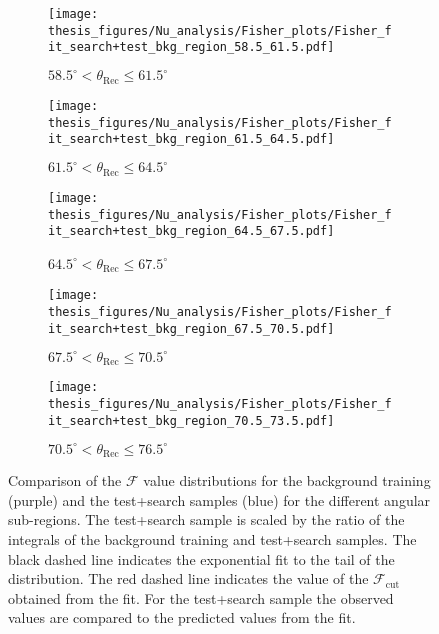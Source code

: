 \begin{figure}[h!]
  \centering
   \begin{subfigure}[l]{.48\textwidth}
     \centering
     \texttt{[image: thesis\_figures/Nu\_analysis/Fisher\_plots/Fisher\_fit\_search+test\_bkg\_region\_58.5\_61.5.pdf]}
     \caption{$ 58.5^{\circ} <\theta_{\text{Rec}} \leq 61.5^{\circ}$}
     \label{fig:58.5-61.5}
   \end{subfigure}
   \begin{subfigure}[r]{.48\textwidth}
     \centering
     \texttt{[image: thesis\_figures/Nu\_analysis/Fisher\_plots/Fisher\_fit\_search+test\_bkg\_region\_61.5\_64.5.pdf]}
     \caption{$ 61.5^{\circ} <\theta_{\text{Rec}} \leq 64.5^{\circ}$}
    \end{subfigure}
    \hfill
    \begin{subfigure}[l]{.48\textwidth}
      \centering
      \texttt{[image: thesis\_figures/Nu\_analysis/Fisher\_plots/Fisher\_fit\_search+test\_bkg\_region\_64.5\_67.5.pdf]}
      \caption{$ 64.5^{\circ} <\theta_{\text{Rec}} \leq 67.5^{\circ}$~}
    \end{subfigure}

    \begin{subfigure}[r]{.48\textwidth}
      \centering
      \texttt{[image: thesis\_figures/Nu\_analysis/Fisher\_plots/Fisher\_fit\_search+test\_bkg\_region\_67.5\_70.5.pdf]}
      \caption{$ 67.5^{\circ} <\theta_{\text{Rec}} \leq 70.5^{\circ}$}
    \end{subfigure}
    \hfill    
    \begin{subfigure}[r]{.48\textwidth}
      \centering
      \texttt{[image: thesis\_figures/Nu\_analysis/Fisher\_plots/Fisher\_fit\_search+test\_bkg\_region\_70.5\_73.5.pdf]}
      \caption{$ 70.5^{\circ} <\theta_{\text{Rec}} \leq 76.5^{\circ}$}
   \end{subfigure}
   \caption{Comparison of the $\mathcal{F}$ value distributions for the background training (purple) and the test+search samples (blue) for the different angular sub-regions. The test+search sample is scaled by the ratio of the integrals of the background training and test+search samples. The black dashed line indicates the exponential fit to the tail of the distribution. The red dashed line indicates the value of the $\mathcal{F}_{\text{cut}}$ obtained from the fit. For the test+search sample the observed values are compared to the predicted values from the fit.}
    \label{fig:Fisher_cut_2}

\end{figure}
